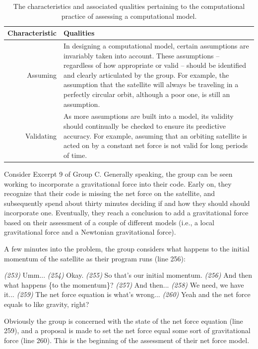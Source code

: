 \documentclass{msuphddissertation}
\begin{document}
\begin{doublespace}
\begin{table}
\begin{tabular}{r|p{}}
Characteristic & Qualities \\\hline\hline
Assuming & In designing a computational model, certain assumptions are invariably taken into account.  These assumptions -- regardless of how appropriate or valid -- should be identified and clearly articulated by the group.  For example, the assumption that the satellite will always be traveling in a perfectly circular orbit, although a poor one, is still an assumption.\\
Validating & As more assumptions are built into a model, its validity should continually be checked to ensure its predictive accuracy.  For example, assuming that an orbiting satellite is acted on by a constant net force is not valid for long periods of time.\\
\end{tabular}\caption{The characteristics and associated qualities pertaining to the computational practice of assessing a computational model.}\label{CH5:AssessingModels}
\end{table}

Consider Excerpt 9 of Group C.  Generally speaking, the group can be seen working to incorporate a gravitational force into their code.  Early on, they recognize that their code is missing the net force on the satellite, and subsequently spend about thirty minutes deciding if and how they should should incorporate one.  Eventually, they reach a conclusion to add a gravitational force based on their assessment of a couple of different models (i.e., a local gravitational force and a Newtonian gravitational force).

A few minutes into the problem, the group considers what happens to the initial momentum of the satellite as their program runs (line 256):
\begin{description}
\SA \textit{(253)} Umm...
\SB	\textit{(254)} Okay.
\SA \textit{(255)} So that's our initial momentum.			
\SA \textit{(256)} And then what happens \{to the momentum\}?
\SD \textit{(257)} And then...
\SA \textit{(258)} We need, we have it...		
\SA \textit{(259)} The net force equation is what's wrong...
\SD \textit{(260)} Yeah and the net force equals to like gravity, right?\end{description}  Obviously the group is concerned with the state of the net force equation (line 259), and a proposal is made to set the net force equal some sort of gravitational force (line 260).  This is the beginning of the assessment of their net force model.


\end{doublespace}
\end{document}
